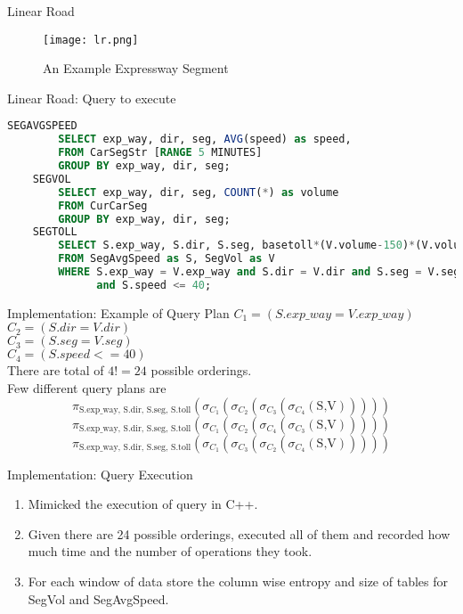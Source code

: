 \begin{frame}{Linear Road}
    \begin{figure}
        \centering
        \texttt{[image: lr.png]}\\
        \caption{An Example Expressway Segment}
        \label{fig:lr_ex}
    \end{figure}
\end{frame}

\begin{frame}[fragile]{Linear Road: Query to execute}
    \begin{lstlisting}[language=SQL]
    SEGAVGSPEED
        SELECT exp_way, dir, seg, AVG(speed) as speed,
        FROM CarSegStr [RANGE 5 MINUTES]
        GROUP BY exp_way, dir, seg;
    SEGVOL
        SELECT exp_way, dir, seg, COUNT(*) as volume
        FROM CurCarSeg
        GROUP BY exp_way, dir, seg;
    SEGTOLL
        SELECT S.exp_way, S.dir, S.seg, basetoll*(V.volume-150)*(V.volume-150)
        FROM SegAvgSpeed as S, SegVol as V
        WHERE S.exp_way = V.exp_way and S.dir = V.dir and S.seg = V.seg
              and S.speed <= 40;
    \end{lstlisting}
\end{frame}

\begin{frame}{Implementation: Example of Query Plan}
$C_1=(S.exp\_way = V.exp\_way)$\\
$C_2=(S.dir = V.dir)$\\
$C_3=(S.seg = V.seg)$\\
$C_4=(S.speed <= 40)$\\
There are total of $4!=24$ possible orderings.\\
Few different query plans are
$$\pi_{\text{S.exp\_way, S.dir, S.seg, S.toll}}(\sigma_{C_1}(\sigma_{C_2}(\sigma_{C_3}(\sigma_{C_4}(\text{S,V})))))$$
$$\pi_{\text{S.exp\_way, S.dir, S.seg, S.toll}}(\sigma_{C_1}(\sigma_{C_2}(\sigma_{C_4}(\sigma_{C_3}(\text{S,V})))))$$
$$\pi_{\text{S.exp\_way, S.dir, S.seg, S.toll}}(\sigma_{C_1}(\sigma_{C_3}(\sigma_{C_2}(\sigma_{C_4}(\text{S,V})))))$$

\end{frame}

\begin{frame}{Implementation: Query Execution}
    \begin{enumerate}
        \item Mimicked the execution of query in C++.
        \item Given there are 24 possible orderings, executed all of them and recorded how much time and the number of operations they took.
        \item For each window of data store the column wise entropy and size of tables for SegVol and SegAvgSpeed.
    \end{enumerate}
\end{frame}

